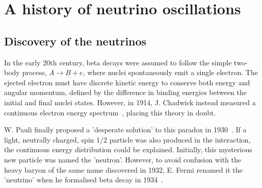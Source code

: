 \section{A history of neutrino oscillations}
\label{sec:theory_history}

\subsection{Discovery of the neutrinos} %
\label{sec:theory_history_neutrinos}

In the early 20th century, beta decays were assumed to follow the simple two-body process,
$A \rightarrow B + e$, where nuclei spontaneously emit a single electron. The ejected electron
must have discrete kinetic energy to conserve both energy and angular momentum, defined by the
difference in binding energies between the initial and final nuclei states. However, in 1914,
J. Chadwick instead measured a continuous electron energy spectrum~\cite{chadwick1914}, placing
this theory in doubt.

W. Pauli finally proposed a 'desperate solution' to this paradox in 1930~\cite{pauli1930}. If a
light, neutrally charged, spin $1/2$ particle was also produced in the interaction, the continuous
energy distribution could be explained. Initially, this mysterious new particle was named the
'neutron'. However, to avoid confusion with the heavy baryon of the same name discovered in 1932,
E. Fermi renamed it the 'neutrino' when he formalised beta decay in 1934~\cite{fermi1934}.

